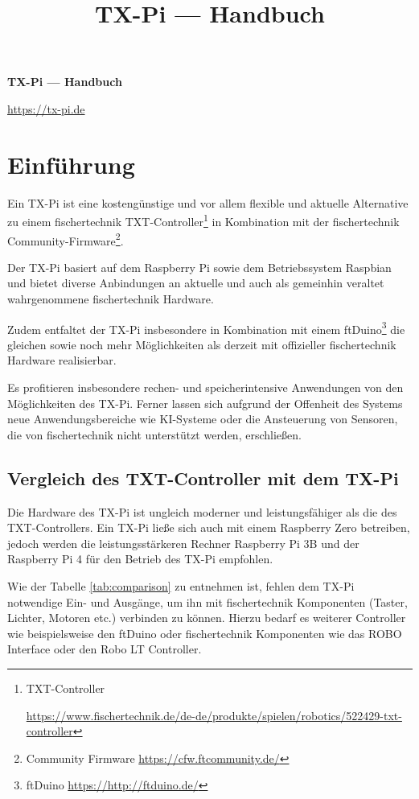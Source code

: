 \documentclass[
  paper=A4,
  ngerman,
  fontsize=12pt,
  parskip=half-,
]{scrbook}
\title{TX-Pi — Handbuch}
\begin{document}
\begin{titlepage}
  \vspace*{1cm}
  {\huge\raggedright\textbf{TX-Pi — Handbuch}\par}
  {\vfill\par}
  {\url{https://tx-pi.de}\par}
\end{titlepage}

\tableofcontents

\chapter{Einführung}

Ein TX-Pi ist eine kostengünstige und vor allem flexible und aktuelle Alternative zu einem 
fischertechnik TXT-Controller\footnote{TXT-Controller\par\url{https://www.fischertechnik.de/de-de/produkte/spielen/robotics/522429-txt-controller}} in Kombination mit der fischertechnik 
Community-Firmware\footnote{Community Firmware \url{https://cfw.ftcommunity.de/}}.

Der TX-Pi basiert auf dem Raspberry Pi sowie dem Betriebssystem Raspbian und bietet
diverse Anbindungen an aktuelle und auch als gemeinhin veraltet wahrgenommene fischertechnik Hardware.

Zudem entfaltet der TX-Pi insbesondere in Kombination mit einem ftDuino\footnote{ftDuino \url{https://http://ftduino.de/}} die
gleichen sowie noch mehr Möglichkeiten als derzeit mit offizieller fischertechnik 
Hardware realisierbar. 

Es profitieren insbesondere rechen- und speicherintensive Anwendungen von den 
Möglichkeiten des TX-Pi. Ferner lassen sich aufgrund der Offenheit des
Systems neue Anwendungsbereiche wie KI-Systeme oder die Ansteuerung von Sensoren, 
die von fischertechnik nicht unterstützt werden, erschließen.


\section{Vergleich des TXT-Controller mit dem TX-Pi}

Die Hardware des TX-Pi ist ungleich moderner und leistungsfähiger als die des TXT-Controllers.
Ein TX-Pi ließe sich auch mit einem Raspberry Zero betreiben, jedoch werden 
die leistungsstärkeren Rechner Raspberry Pi 3B und der Raspberry Pi 4 für den Betrieb des TX-Pi empfohlen.

Wie der Tabelle \ref{tab:comparison} zu entnehmen ist, fehlen dem TX-Pi notwendige Ein- und Ausgänge,
um ihn mit fischertechnik Komponenten (Taster, Lichter, Motoren etc.) verbinden zu können.
Hierzu bedarf es weiterer Controller wie beispielsweise den ftDuino oder fischertechnik
Komponenten wie das ROBO Interface oder den Robo LT Controller.
\end{document}
